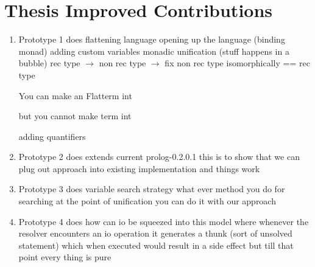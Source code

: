 \documentclass[thesis-solanki.tex]{subfiles}
\begin{document}
\section{Thesis Improved Contributions}

\begin{enumerate}
\item Prototype 1 does
flattening language
opening up the language (binding monad)
adding custom variables
monadic unification (stuff happens in a bubble)
rec type $\rightarrow$ non rec type $\rightarrow$ fix non rec type isomorphically == rec type

You can make an Flatterm int

but you cannot make term int

adding quantifiers


\item Prototype 2 does
extends current prolog-0.2.0.1
this is to show that we can plug out approach into existing implementation and things work

\item Prototype 3 does
variable search strategy
what ever method you do for searching at the point of unification you can do it with our approach

\item Prototype 4 does
how can io be squeezed into this model where whenever the resolver encounters an io operation it generates a thunk (sort of unsolved
statement) which when executed would result in a side effect but till that point every thing is pure

\end{enumerate}
\end{document}
